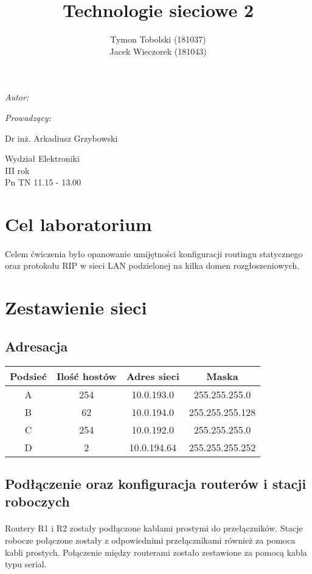 \documentclass[wide,a4paper,titlepage,12pt] {article}
\title{Technologie sieciowe 2}
\author{Tymon Tobolski (181037)\\ Jacek Wieczorek (181043)}
\makeatletter
\renewcommand{\maketitle}{
\begin{titlepage}
  \begin{center}
    \vspace*{3cm}
    \LARGE \@title \par
    \vspace{2cm}
    \textit{\small Autor:}\par
    \normalsize \@author\par \normalsize
    \vspace{3cm}
    \textit{\small Prowadzący:}\par
    Dr inż. Arkadiusz Grzybowski\par
    \vspace{2cm}
    Wydział Elektroniki\\ III rok\\ Pn TN 11.15 - 13.00\par
    \vspace{4cm}
    \small \@date
  \end{center}
\end{titlepage}
}
\makeatother
\begin{document}
\maketitle
  \section{Cel laboratorium}
  \paragraph{}
  Celem ćwiczenia było opanowanie umijętności konfiguracji routingu statycznego oraz protokołu RIP w sieci LAN podzielonej na kilka domen rozgłoszeniowych.

  \section{Zestawienie sieci}

  \subsection{Adresacja}

  \begin{center}
    \begin{tabular}{|c|c|c|c|}
      \hline
      Podsieć & Ilość hostów & Adres sieci & Maska \\
      \hline
      A & 254 & 10.0.193.0  & 255.255.255.0 \\
      B & 62  & 10.0.194.0  & 255.255.255.128 \\
      C & 254 & 10.0.192.0  & 255.255.255.0 \\
      D & 2   & 10.0.194.64 & 255.255.255.252 \\
      \hline
    \end{tabular}
  \end{center}

  \subsection{Podłączenie oraz konfiguracja routerów i stacji roboczych}
  \paragraph{}
  Routery R1 i R2 zostały podłączone kablami prostymi do przełączników. Stacje robocze połączone zostały z odpowiednimi przełącznikami również za pomoca kabli prostych. Połączenie między routerami zostało zestawione za pomocą kabla typu serial.
\end{document}
